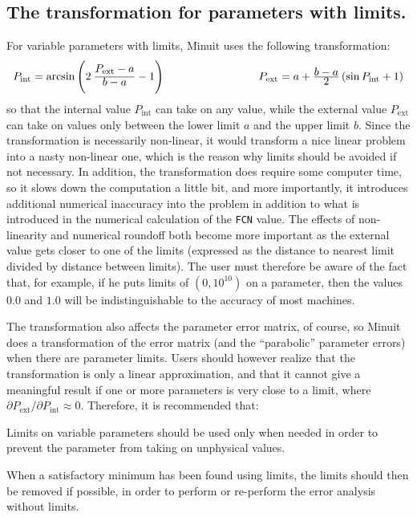 \subsection{The transformation for parameters with limits.}

For variable parameters with limits, Minuit uses the following transformation:
$$
\begin{array}{l@{\hspace{3cm}}l}
P_{\mathrm{int}} = \arcsin
        \left( 2\: \frac{\Tstm P_{\mathrm{ext}}-a\Rule}{\Tstm b-a} - 1 \right)       &
P_{\mathrm{ext}} = a + \frac{\Tstm b - a}{\Tstm 2}
        \left( \sin P_{\mathrm{int}} + 1 \right)                  \\
\end{array}
$$
so that the internal value $P_{\mathrm{int}}$ can take on any value, while
the external value $P_{\mathrm{ext}}$ can take on values only between the lower
limit $a$ and the upper limit $b$.
Since the transformation is necessarily non-linear, it would transform a
nice linear problem into a nasty non-linear one, which is the reason why
limits should be avoided if not necessary. 
In addition, the transformation
does require some computer time, so it slows down the computation a little
bit, and more importantly, it introduces additional numerical inaccuracy into
the problem in addition to what is introduced in the numerical calculation
of the \texttt{FCN} value.  
The effects of non-linearity and numerical roundoff both
become more important as the external value gets closer to one of the limits
(expressed as the distance to nearest limit divided by distance between limits).
The user must therefore be aware of the fact that, for example,
if he puts limits of $(0,10^{10})$ on a parameter, then the values $0.0$ 
and $1.0$ will be indistinguishable to the accuracy of most machines.

The transformation also affects the parameter error matrix, of course,
so Minuit does a transformation of the error matrix (and the 
``parabolic'' parameter errors) when there are parameter limits.
Users should however realize that the transformation is only a linear
approximation, and that it cannot give a meaningful result if one or more
parameters is very close to a limit, where
$\partial P_{\mathrm{ext}} / \partial P_{\mathrm{int}} \approx 0$.
Therefore, it is recommended that:
\begin{UL}
\item Limits on variable parameters should be used only when needed in order
to prevent the parameter from taking on unphysical values.
\item When a satisfactory minimum has been found using limits, the limits
should then be removed if possible, in order to perform or re-perform the
error analysis without limits.
\end{UL}

